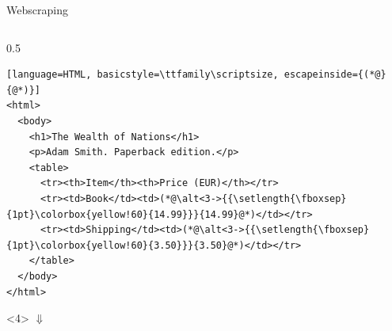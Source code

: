 \documentclass[9pt,aspectratio=169]{beamer}
\begin{document}
\begin{frame}[fragile]{Webscraping}
\begin{columns}[T]
\begin{column}{0.5\textwidth}
\begin{onlyenv}
\begin{lstlisting}[language=HTML, basicstyle=\ttfamily\scriptsize, escapeinside={(*@}{@*)}]
<html>
  <body>
    <h1>The Wealth of Nations</h1>
    <p>Adam Smith. Paperback edition.</p>
    <table>
      <tr><th>Item</th><th>Price (EUR)</th></tr>
      <tr><td>Book</td><td>(*@\alt<3->{{\setlength{\fboxsep}{1pt}\colorbox{yellow!60}{14.99}}}{14.99}@*)</td></tr>
      <tr><td>Shipping</td><td>(*@\alt<3->{{\setlength{\fboxsep}{1pt}\colorbox{yellow!60}{3.50}}}{3.50}@*)</td></tr>
    </table>
  </body>
</html>
\end{lstlisting}
  \end{onlyenv}
  \begin{onlyenv}<4>
  \vspace{1mm}
  $\Downarrow$\\[1mm]
  \end{onlyenv}
  \end{column}
\end{columns}
\end{frame}
\end{document}
